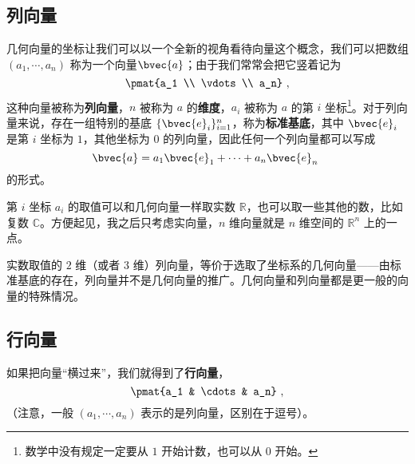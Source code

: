 
\begin{issues}
\issueDraft
\issueMissDepend
\end{issues}

\subsection{列向量}

几何向量的坐标让我们可以以一个全新的视角看待向量这个概念，我们可以把数组 $(a_1, \cdots, a_n)$ 称为一个向量$\bvec{a}$；由于我们常常会把它竖着记为
\begin{equation}
\pmat{a_1 \\ \vdots \\ a_n}~,
\end{equation}
这种向量被称为\textbf{列向量}，$n$ 被称为 $a$ 的\textbf{维度}，$a_i$ 被称为 $a$ 的第 $i$ 坐标\footnote{数学中没有规定一定要从 $1$ 开始计数，也可以从 $0$ 开始。}。对于列向量来说，存在一组特别的基底 $\{\bvec{e}_i\}_{i = 1}^n$，称为\textbf{标准基底}，其中 $\bvec{e}_i$ 是第 $i$ 坐标为 $1$，其他坐标为 $0$ 的列向量，因此任何一个列向量都可以写成
\begin{equation}
\bvec{a} = a_1 \bvec{e}_1 + \cdots + a_n \bvec{e}_n~
\end{equation}
的形式。

第 $i$ 坐标 $a_i$ 的取值可以和几何向量一样取实数 $\mathbb{R}$，也可以取一些其他的数，比如复数 $\mathbb{C}$。方便起见，我之后只考虑实向量，$n$ 维向量就是 $n$ 维空间的 $\mathbb{R}^n$ 上的一点。



实数取值的 $2$ 维（或者 $3$ 维）列向量，等价于选取了坐标系的几何向量——由标准基底的存在，列向量并不是几何向量的推广。几何向量和列向量都是更一般的向量的特殊情况。

\subsection{行向量}

如果把向量“横过来”，我们就得到了\textbf{行向量}，
\begin{equation}
\pmat{a_1 & \cdots & a_n}~,
\end{equation}
（注意，一般 $(a_1, \cdots, a_n)$ 表示的是列向量，区别在于逗号）。

